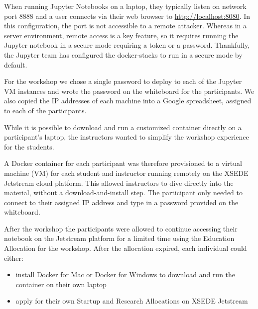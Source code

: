 When running Jupyter Notebooks on a laptop, they typically listen on network
port 8888 and a user connects via their web browser to
\url{http://localhost:8080}. In this configuration, the port is not accessible
to a remote attacker. Whereas in a server environment, remote access is a key
feature, so it requires running the Jupyter notebook in a secure mode requiring
a token or a password. Thankfully, the Jupyter team has configured the
docker-stacks to run in a secure mode by default.

For the workshop we chose a single password to deploy to each of the Jupyter VM
instances and wrote the password on the whiteboard for the participants. We also
copied the IP addresses of each machine into a Google spreadsheet, assigned to
each of the participants.

While it is possible to download and run a customized container directly on a
participant’s laptop, the instructors wanted to simplify the workshop
experience for the students.

A Docker container for each participant was therefore provisioned to
a virtual machine (VM) for each student and instructor running remotely on the
XSEDE Jetstream cloud platform. This allowed instructors to dive directly into
the material, without a download-and-install step. The participant only needed
to connect to their assigned IP address and type in a password provided on the
whiteboard.

After the workshop the participants were allowed to continue accessing their
notebook on the Jetstream platform for a limited time using the Education
Allocation for the workshop. After the allocation expired, each individual could
either:

\begin{itemize}

\item install Docker for Mac or Docker for Windows to download and run the
container on their own laptop

\item apply for their own Startup and Research Allocations on XSEDE Jetstream

\end{itemize}
